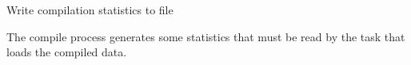 \documentclass[letterpaper,10pt,english]{sphinxmanual}
\begin{document}
\begin{fulllineitems}
\begin{fulllineitems}
\begin{itemize}
\end{itemize}

\end{fulllineitems}


\begin{fulllineitems}
\label{graf/graf:graf.Graf.stamp}
\end{fulllineitems}


\begin{fulllineitems}
\label{graf/graf:graf.Graf.write_stats}
Write compilation statistics to file

The compile process generates some statistics that must be read by the task that loads the compiled data.

\end{fulllineitems}


\end{fulllineitems}

\end{document}
